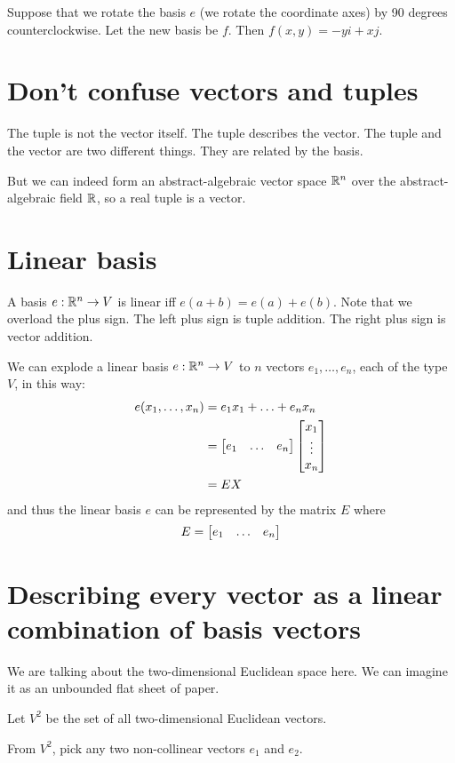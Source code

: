 Suppose that we rotate the basis \(e\)
(we rotate the coordinate axes) by 90 degrees counterclockwise.
Let the new basis be \(f\).
Then \(f(x,y) = -yi + xj\).

\section*{Don't confuse vectors and tuples}

The tuple is not the vector itself.
The tuple describes the vector.
The tuple and the vector are two different things.
They are related by the basis.

But we can indeed form an abstract-algebraic vector space \(\mathbb{R}^n\) over the abstract-algebraic field \(\mathbb{R}\),
so a real tuple is a vector.

\section{Linear basis}

A basis \(e : \mathbb{R}^n \to V\) is linear iff \(e(a+b) = e(a) + e(b)\).
Note that we overload the plus sign.
The left plus sign is tuple addition.
The right plus sign is vector addition.

We can explode a linear basis \(e : \mathbb{R}^n \to V\) to \(n\) vectors \(e_1,\ldots,e_n\),
each of the type \(V\), in this way:
\begin{align*}
    e(x_1,\ldots,x_n) &= e_1 x_1 + \ldots + e_n x_n
    \\ &= \begin{bmatrix}e_1 & \ldots & e_n\end{bmatrix}\begin{bmatrix}x_1 \\ \vdots \\ x_n\end{bmatrix}
    \\ &= EX
\end{align*}
and thus the linear basis \(e\) can be represented by the matrix \(E\) where
\[
    E = \begin{bmatrix}e_1 & \ldots & e_n\end{bmatrix}
\]

\section{Describing every vector as a linear combination of basis vectors}

We are talking about the two-dimensional Euclidean space here.
We can imagine it as an unbounded flat sheet of paper.

Let \(V^2\) be the set of all two-dimensional Euclidean vectors.

From \(V^2\), pick any two non-collinear vectors \(e_1\) and \(e_2\).

